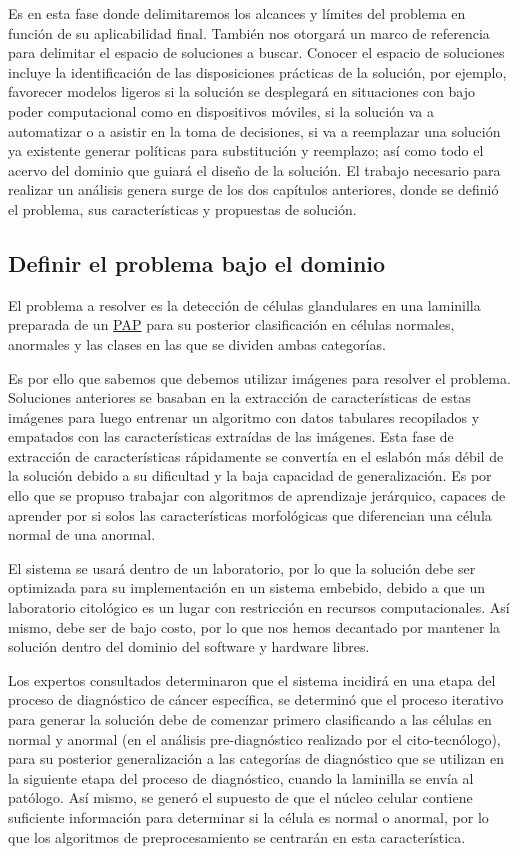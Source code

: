 Es en esta fase donde delimitaremos los alcances y límites del problema en
función de su aplicabilidad final. También nos otorgará un marco de referencia
para delimitar el espacio de soluciones a buscar. Conocer el espacio de
soluciones incluye la identificación de las disposiciones prácticas de la
solución, por ejemplo, favorecer modelos ligeros si la solución se desplegará en
situaciones con bajo poder computacional como en dispositivos móviles, si la
solución va a automatizar o a asistir en la toma de decisiones, si va a
reemplazar una solución ya existente generar políticas para substitución y
reemplazo; así como todo el acervo del dominio que guiará el diseño de la
solución. El trabajo necesario para realizar un análisis genera surge de los dos
capítulos anteriores, donde se definió el problema, sus características y
propuestas de solución.

\subsection{Definir el problema bajo el dominio}

El problema a resolver es la detección de células glandulares en una laminilla
preparada de un \hyperlink{abbr}{PAP} para su posterior clasificación en
células normales, anormales y las clases en las que se dividen ambas categorías.

Es por ello que sabemos que debemos utilizar imágenes para resolver el problema.
Soluciones anteriores se basaban en la extracción de características de estas
imágenes para luego entrenar un algoritmo con datos tabulares recopilados y
empatados con las características extraídas de las imágenes. Esta fase de
extracción de características rápidamente se convertía en el eslabón más débil
de la solución debido a su dificultad y la baja capacidad de generalización. Es
por ello que se propuso trabajar con algoritmos de aprendizaje jerárquico,
capaces de aprender por si solos las características morfológicas que
diferencian una célula normal de una anormal.

El sistema se usará dentro de un laboratorio, por lo que la solución debe ser
optimizada para su implementación en un sistema embebido, debido a que un
laboratorio citológico es un lugar con restricción en recursos computacionales.
Así mismo, debe ser de bajo costo, por lo que nos hemos decantado por mantener
la solución dentro del dominio del software y hardware libres.

Los expertos consultados determinaron que el sistema incidirá en una etapa del
proceso de diagnóstico de cáncer específica, se determinó que el proceso
iterativo para generar la solución debe de comenzar primero clasificando a las
células en normal y anormal (en el análisis pre-diagnóstico realizado por el
cito-tecnólogo), para su posterior generalización a las categorías de
diagnóstico que se utilizan en la siguiente etapa del proceso de diagnóstico,
cuando la laminilla se envía al patólogo. Así mismo, se generó el supuesto de
que el núcleo celular contiene suficiente información para determinar si la
célula es normal o anormal, por lo que los algoritmos de preprocesamiento se
centrarán en esta característica.

